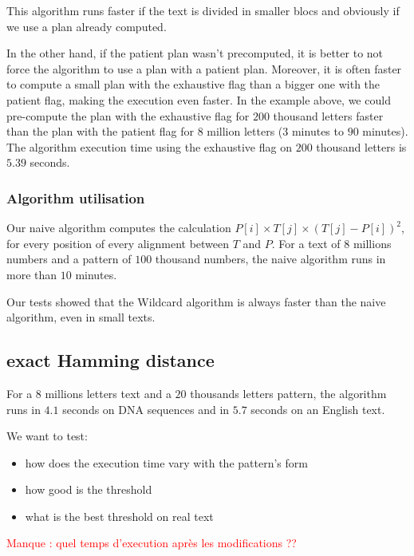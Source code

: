 \documentclass[preprint,12pt]{elsarticle}
\begin{document}
This algorithm runs faster if the text is divided in smaller blocs
and obviously if we use a plan already computed.

In the other hand, if the patient plan wasn't precomputed,
it is better to not force the algorithm to use a plan with a patient plan.
Moreover, it is often faster to compute a small plan with the exhaustive flag
than a bigger one with the patient flag, making the execution even faster.
In the example above, we could pre-compute the plan
with the exhaustive flag for $200$ thousand letters faster than
the plan with the patient flag for $8$ million letters ($3$ minutes to $90$ minutes).
The algorithm execution time using the exhaustive flag on $200$ thousand letters is $5.39$ seconds.

\subsubsection*{Algorithm utilisation}

Our naive algorithm computes the calculation $P[i] \times T[j] \times (T[j]-P[i])^2$,
for every position of every alignment between $T$ and $P$.
For a text of $8$ millions numbers and a pattern of $100$ thousand numbers,
the naive algorithm runs in more than $10$ minutes.

Our tests showed that the Wildcard algorithm is always faster than the naive algorithm, even in small texts.





\subsection{exact Hamming distance}


For a $8$ millions letters text and a $20$ thousands letters pattern, 
the algorithm runs in $4.1$ seconds on DNA sequences and in $5.7$ seconds on an English text.

We want to test:
\begin{itemize}
\setlength\itemsep{-0.4em}
\item how does the execution time vary with the pattern's form
\item how good is the threshold
\item what is the best threshold on real text
\end{itemize}

\textcolor{red}{Manque : quel temps d'execution après les modifications ??}
\end{document}
